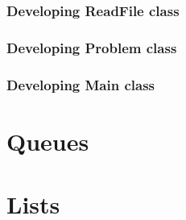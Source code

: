 \documentclass[a4paper]{article}
\theoremstyle{plain}
\theoremstyle{definition}
\begin{document}
        \subsubsection{Developing ReadFile class}
        \subsubsection{Developing Problem class}
        \subsubsection{Developing Main class}
	
	
        
	
	\section{Queues}
	

	\section{Lists}

	

	

	
	
	
	
	
\end{document}
